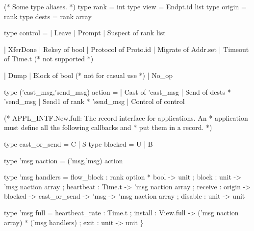 \begin{codebox}
(* Some type aliases.
 *)
type rank	= int
type view 	= Endpt.id list
type origin 	= rank
type dests 	= rank array

type control =
  | Leave
  | Prompt
  | Suspect of rank list

  | XferDone
  | Rekey of bool 
  | Protocol of Proto.id
  | Migrate of Addr.set
  | Timeout of Time.t            (* not supported *)

  | Dump
  | Block of bool                (* not for casual use *)
  | No_op

type ('cast_msg,'send_msg) action =
  | Cast of 'cast_msg
  | Send of dests * 'send_msg
  | Send1 of rank * 'send_msg
  | Control of control



\end{codebox}
\begin{codebox}
(* APPL_INTF.New.full: The record interface for applications.  An
 * application must define all the following callbacks and
 * put them in a record.
 *)

  type cast_or_send = C | S
  type blocked = U | B

  type 'msg naction = ('msg,'msg) action

  type 'msg handlers = {
    flow_block : rank option * bool -> unit ;
    block : unit -> 'msg naction array ;
    heartbeat : Time.t -> 'msg naction array ;
    receive : origin -> blocked -> cast_or_send -> 'msg -> 'msg naction array ;
    disable : unit -> unit
  } 

  type 'msg full = {
    heartbeat_rate : Time.t ;
    install : View.full -> ('msg naction array) * ('msg handlers) ;
    exit : unit -> unit
  } 
\}
\end{codebox}

